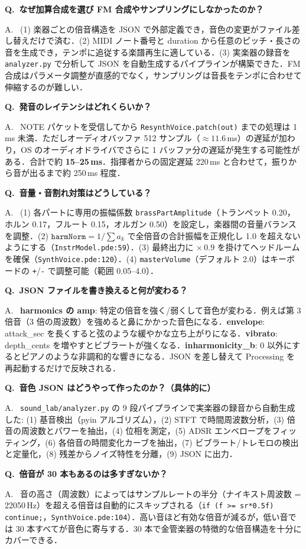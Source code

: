 \documentclass[uplatex,dvipdfmx,a4paper,10pt]{jsarticle}
\newcommand{\QA}[2]{%
  \par\noindent\textbf{\textcolor{qcolor}{Q.~#1}}%
  \par\noindent\textcolor{acolor}{A.~#2}\medskip%
}
\begin{document}
\QA{なぜ加算合成を選び FM 合成やサンプリングにしなかったのか？}{
(1) 楽器ごとの倍音構造を JSON で外部定義でき，音色の変更がファイル差し替えだけで済む．(2) MIDI ノート番号と duration から任意のピッチ・長さの音を生成でき，テンポに追従する楽譜再生に適している．(3) 実楽器の録音を \texttt{analyzer.py} で分析して JSON を自動生成するパイプラインが構築できた．FM 合成はパラメータ調整が直感的でなく，サンプリングは音長をテンポに合わせて伸縮するのが難しい．}

\QA{発音のレイテンシはどれくらいか？}{
NOTE パケットを受信してから \texttt{ResynthVoice.patch(out)} までの処理は 1\,ms 未満．ただしオーディオバッファ 512 サンプル（$\approx 11.6$\,ms）の遅延が加わり，OS のオーディオドライバでさらに 1 バッファ分の遅延が発生する可能性がある．合計で約 \textbf{15--25\,ms}．指揮者からの固定遅延 220\,ms と合わせて，振りから音が出るまで約 250\,ms 程度．}

\QA{音量・音割れ対策はどうしている？}{
(1) 各パートに専用の振幅係数 \texttt{brassPartAmplitude}（トランペット 0.20，ホルン 0.17，フルート 0.15，オルガン 0.50）を設定し，楽器間の音量バランスを調整．(2) $\texttt{harmNorm} = 1/\sum a_k$ で全倍音の合計振幅を正規化し 1.0 を超えないようにする（\texttt{InstrModel.pde:59}）．(3) 最終出力に ${\times}\,0.9$ を掛けてヘッドルームを確保（\texttt{SynthVoice.pde:120}）．(4) \texttt{masterVolume}（デフォルト 2.0）はキーボードの \texttt{+}/\texttt{-} で調整可能（範囲 0.05--4.0）．}

\QA{JSON ファイルを書き換えると何が変わる？}{
\textbf{harmonics の amp}: 特定の倍音を強く/弱くして音色が変わる．例えば第 3 倍音（3 倍の周波数）を強めると鼻にかかった音色になる．\textbf{envelope}: attack\_sec を長くすると弦のような緩やかな立ち上がりになる．\textbf{vibrato}: depth\_cents を増やすとビブラートが強くなる．\textbf{inharmonicity\_b}: 0 以外にするとピアノのような非調和的な響きになる．JSON を差し替えて Processing を再起動するだけで反映される．}

\QA{音色 JSON はどうやって作ったのか？（具体的に）}{
\texttt{sound\_lab/analyzer.py} の 9 段パイプラインで実楽器の録音から自動生成した:
(1) 基音検出（pyin アルゴリズム），(2) STFT で時間周波数分析，(3) 倍音の周波数とパワーを抽出，(4) 位相を測定，(5) ADSR エンベロープをフィッティング，(6) 各倍音の時間変化カーブを抽出，(7) ビブラート/トレモロの検出と定量化，(8) 残差からノイズ特性を分離，(9) JSON に出力．}

\QA{倍音が 30 本もあるのは多すぎないか？}{
音の高さ（周波数）によってはサンプルレートの半分（ナイキスト周波数 = 22050\,Hz）を超える倍音は自動的にスキップされる（\texttt{if (f >= sr*0.5f) continue;}，\texttt{SynthVoice.pde:104}）．高い音ほど有効な倍音が減るが，低い音では 30 本すべてが音色に寄与する．30 本で金管楽器の特徴的な倍音構造を十分にカバーできる．}
\end{document}
